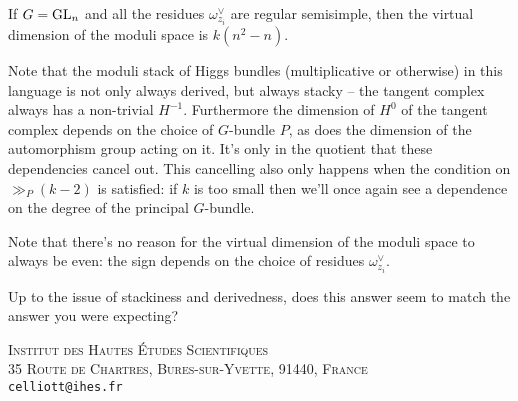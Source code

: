\documentclass[10pt, oneside]{article}
\begin{document}
\begin{example}
If $G = \mathrm{GL}_n$ and all the residues $\omega^\vee_{z_i}$ are regular semisimple, then the virtual dimension of the moduli space is $k(n^2-n)$.
\end{example}

\begin{remark}
Note that the moduli stack of Higgs bundles (multiplicative or otherwise) in this language is not only always derived, but always stacky -- the tangent complex always has a non-trivial $H^{-1}$.  Furthermore the dimension of $H^0$ of the tangent complex depends on the choice of $G$-bundle $P$, as does the dimension of the automorphism group acting on it.  It's only in the quotient that these dependencies cancel out.  This cancelling also only happens when the condition on $\gg_P(k-2)$ is satisfied: if $k$ is too small then we'll once again see a dependence on the degree of the principal $G$-bundle.
\end{remark}

\begin{remark}
Note that there's no reason for the virtual dimension of the moduli space to always be even: the sign depends on the choice of residues $\omega^\vee_{z_i}$.
\end{remark}

\begin{question}
Up to the issue of stackiness and derivedness, does this answer seem to match the answer you were expecting?
\end{question}


\textsc{Institut des Hautes \'Etudes Scientifiques}\\
\textsc{35 Route de Chartres, Bures-sur-Yvette, 91440, France}\\
\texttt{celliott@ihes.fr}\\
\vspace{5pt}
\end{document}
